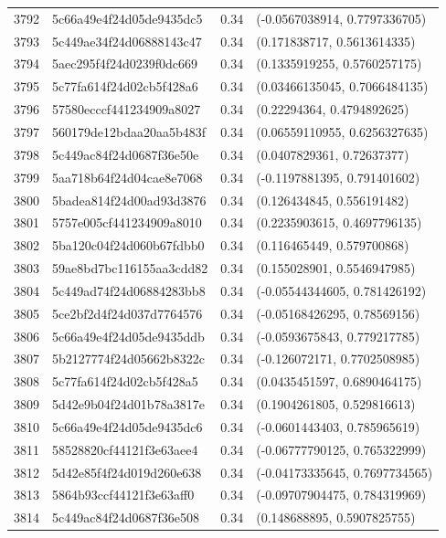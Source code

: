 \begin{table}[ht]
\begin{tabular}{rlrl}
  3792 & 5c66a49e4f24d05de9435dc5 & 0.34 & (-0.0567038914, 0.7797336705) \\ 
  3793 & 5c449ae34f24d06888143c47 & 0.34 & (0.171838717, 0.5613614335) \\ 
  3794 & 5aec295f4f24d0239f0dc669 & 0.34 & (0.1335919255, 0.5760257175) \\ 
  3795 & 5c77fa614f24d02cb5f428a6 & 0.34 & (0.03466135045, 0.7066484135) \\ 
  3796 & 57580ecccf441234909a8027 & 0.34 & (0.22294364, 0.4794892625) \\ 
  3797 & 560179de12bdaa20aa5b483f & 0.34 & (0.06559110955, 0.6256327635) \\ 
  3798 & 5c449ac84f24d0687f36e50e & 0.34 & (0.0407829361, 0.72637377) \\ 
  3799 & 5aa718b64f24d04cae8e7068 & 0.34 & (-0.1197881395, 0.791401602) \\ 
  3800 & 5badea814f24d00ad93d3876 & 0.34 & (0.126434845, 0.556191482) \\ 
  3801 & 5757e005cf441234909a8010 & 0.34 & (0.2235903615, 0.4697796135) \\ 
  3802 & 5ba120c04f24d060b67fdbb0 & 0.34 & (0.116465449, 0.579700868) \\ 
  3803 & 59ae8bd7bc116155aa3cdd82 & 0.34 & (0.155028901, 0.5546947985) \\ 
  3804 & 5c449ad74f24d06884283bb8 & 0.34 & (-0.05544344605, 0.781426192) \\ 
  3805 & 5ce2bf2d4f24d037d7764576 & 0.34 & (-0.05168426295, 0.78569156) \\ 
  3806 & 5c66a49e4f24d05de9435ddb & 0.34 & (-0.0593675843, 0.779217785) \\ 
  3807 & 5b2127774f24d05662b8322c & 0.34 & (-0.126072171, 0.7702508985) \\ 
  3808 & 5c77fa614f24d02cb5f428a5 & 0.34 & (0.0435451597, 0.6890464175) \\ 
  3809 & 5d42e9b04f24d01b78a3817e & 0.34 & (0.1904261805, 0.529816613) \\ 
  3810 & 5c66a49e4f24d05de9435dc6 & 0.34 & (-0.0601443403, 0.785965619) \\ 
  3811 & 58528820cf44121f3e63aee4 & 0.34 & (-0.06777790125, 0.765322999) \\ 
  3812 & 5d42e85f4f24d019d260e638 & 0.34 & (-0.04173335645, 0.7697734565) \\ 
  3813 & 5864b93ccf44121f3e63aff0 & 0.34 & (-0.09707904475, 0.784319969) \\ 
  3814 & 5c449ac84f24d0687f36e508 & 0.34 & (0.148688895, 0.5907825755) \\ 

\end{tabular}
\end{table}
